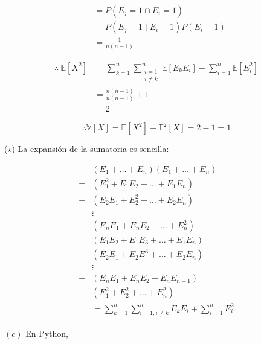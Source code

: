 \documentclass[a4paper, 12pt]{article}
\begin{document}
\begin{align*}
  &= P(E_j = 1 \cap  E_i = 1) \\ 
  &=P(E_j = 1 \mid E_i = 1)P(E_i = 1) \\ 
  &= \frac{1}{n(n-1)}
\end{align*}

\begin{align*}
  \therefore  ~ \mathbb{E}\left[ X^2 \right]  
  &= \sum_{k=1}^n\sum_{\substack{i=1\\i \neq k}}^n \mathbb{E}\left[ E_k E_i \right] + \sum_{i=1}^n
  \mathbb{E}\left[ E_i^2 \right] \\
  &=\frac{n(n -1)}{n(n-1)} + 1\\ 
  &= 2
\end{align*}

\begin{equation*}
  \therefore \mathbb{V}\left[ X \right] = \mathbb{E}\left[ X^2 \right] -
  \mathbb{E}^2\left[ X \right] = 2 - 1 = 1
\end{equation*}

\begin{helpframe}
\small
  ($\star$) La expansión de la sumatoria es sencilla: 

  \begin{align*}
    &(E_1 + \ldots + E_n)(E_1 + \ldots + E_n) \\
    =& (E_1^2 + E_1E_2 + \ldots + E_1E_n) \\ 
    +&(E_2E_1 + E_2^2 + \ldots + E_2 E_n)\\
     &\vdots \\ 
    +&(E_nE_1 + E_nE_2 + \ldots + E_n^2) \\ 
    =& (E_1E_2 + E_1E_3 + \ldots + E_1E_n) \\ 
    +&(E_2E_1 + E_2E^3 + \ldots + E_2 E_n) \\
     &\vdots \\ 
    +&(E_nE_1 + E_nE_2 + E_nE_{n-1}) \\ 
    +&(E_1^2 + E_2^2 + \ldots +E_n^2) \\ 
     &=\sum_{k=1}^n\sum_{i=1, i \neq k}^n E_kE_i + \sum_{i=1}^n E_i^2
  \end{align*}
\end{helpframe}
\normalsize

\pagebreak 

$(c)$ En Python, 
\end{document}
